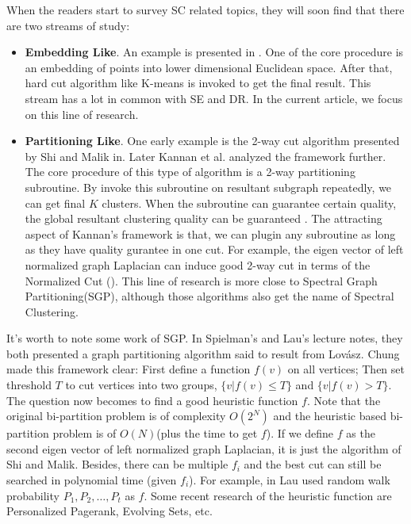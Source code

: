 When the readers start to survey SC related topics, they will soon find that
there are two streams of study:
\begin{itemize}
	\item \textbf{Embedding Like}. 
		An example is presented in 
		\ralg{\ref{alg:sc_sample}}. One of the core procedure is 
		an embedding of points into lower dimensional Euclidean space. 
		After that, hard cut algorithm like K-means is invoked to 
		get the final result. 		
		This stream has a lot in common with SE and
		DR. In the current article, we focus on this line of research. 
	\item \textbf{Partitioning Like}. 
		One early example is the 
		2-way cut algorithm presented by Shi and Malik in\cite{shi2000normalized}.
		Later Kannan et al. analyzed the framework further\cite{kannan2004clusterings}. 
		The core procedure of this type of algorithm is a 2-way 
		partitioning subroutine. By invoke this subroutine on 
		resultant subgraph repeatedly, we can get final $K$ clusters. 
		When the subroutine can guarantee certain quality, 
		the global resultant clustering quality can be guaranteed
		\cite{kannan2004clusterings}. The attracting aspect of Kannan's framework
		is that, we can plugin any subroutine as long as they have 
		quality gurantee in one cut. For example, the eigen vector of 
		left normalized graph Laplacian can induce good 2-way cut 
		in terms of the Normalized Cut\cite{shi2000normalized}
		(\rsec{\ref{sec:ncut}}). This line of research is more close 
		to Spectral Graph Partitioning(SGP), although those algorithms also get the name 
		of Spectral Clustering. 
\end{itemize}

It's worth to note some work of SGP. In Spielman's\cite{spielman-2009spectral-ln} 
and Lau's\cite{lau-2012-spectral-ln} lecture notes, they both presented a 
graph partitioning algorithm said to result from Lov{\'a}sz\cite{lovasz1990mixing}. 
Chung\cite{chung2007random} made this framework clear: First define a function 
$f(v)$ on all vertices; Then set threshold $T$ to cut vertices into two groups, 
$\{v|f(v) \le T\}$ and $\{v|f(v) > T\}$. The question now becomes to find a 
good heuristic function $f$. Note that the original bi-partition problem is of
complexity $O(2^N)$ and the heuristic based bi-partition problem is of 
$O(N)$(plus the time to get $f$). If we define $f$ as the second eigen vector 
of left normalized graph Laplacian, it is just the algorithm of Shi and
Malik\cite{shi2000normalized}. Besides, there can be multiple $f_i$ and 
the best cut can still be searched in polynomial time
(given $f_i$). For example, in 
\cite{lau-2012-spectral-ln} Lau used random walk probability 
$P_1, P_2, \ldots, P_t$ as $f$. Some recent research of the heuristic function
are Personalized Pagerank\cite{andersen2007detecting}, 
Evolving Sets\cite{andersen2009finding}, etc. 

